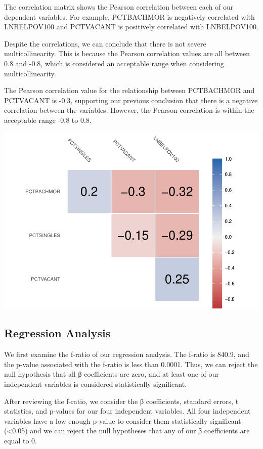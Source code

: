 \documentclass[
]{article}
\begin{document}
The correlation matrix shows the Pearson correlation between each of our
dependent variables. For example, PCTBACHMOR is negatively correlated
with LNBELPOV100 and PCTVACANT is positively correlated with
LNBELPOV100.

Despite the correlations, we can conclude that there is not severe
multicollinearity. This is because the Pearson correlation values are
all between 0.8 and -0.8, which is considered an acceptable range when
considering multicollinearity.

The Pearson correlation value for the relationship between PCTBACHMOR
and PCTVACANT is -0.3, supporting our previous conclusion that there is
a negative correlation between the variables. However, the Pearson
correlation is within the acceptable range -0.8 to 0.8.

\includegraphics{HW1-Regression_files/figure-latex/pearson-1.pdf}

\hypertarget{regression-analysis}{%
\subsection{Regression Analysis}\label{regression-analysis}}

We first examine the f-ratio of our regression analysis. The f-ratio is
840.9, and the p-value associated with the f-ratio is less than 0.0001.
Thus, we can reject the null hypothesis that all β coefficients are
zero, and at least one of our independent variables is considered
statistically significant.

After reviewing the f-ratio, we consider the β coefficients, standard
errors, t statistics, and p-values for our four independent variables.
All four independent variables have a low enough p-value to consider
them statistically significant (\textless0.05) and we can reject the
null hypotheses that any of our β coefficients are equal to 0.
\end{document}
